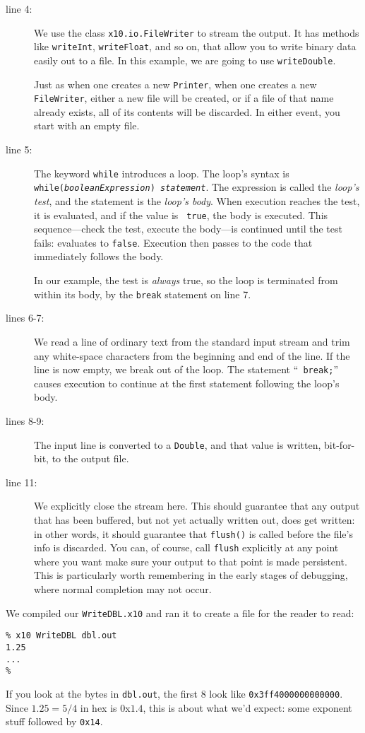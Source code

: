 \begin{description}
\item[line 4:] We use the class {\tt x10.io.FileWriter} to stream the output. 
It has methods like {\tt writeInt}, {\tt writeFloat}, and so on, that allow you
to write binary data easily out to a file.  In this example, we are going to use
{\tt writeDouble}.

Just as when one creates a new {\tt Printer}, when one creates a new {\tt
FileWriter}, either a new file will be created, or if a file of that
name already exists, all of its contents will be discarded.  In either event,
you start with an empty file.
\item[line 5:] The keyword {\tt while} introduces a loop.  The loop's syntax is
{\tt while({\em boolean\-Expres\-sion}) {\em statement}}.  The expression is
called the {\em loop's test}, and the statement is the {\em loop's body}. 
When execution reaches the test, it is evaluated, and if the value is {\tt
true}, the body is executed. This sequence---check the test, execute the
body---is continued until the test fails: \ie{} evaluates to {\tt false}.
Execution then passes to the code that immediately follows the body.

In our example, the test is {\em always} true, so the loop is 
terminated from within its body, by the {\tt break} statement on line 7.  
\item[lines 6-7:] We read a line of ordinary text from the standard input
stream and trim any white-space characters from the beginning and end of the
line.  If the line is now empty, we break out of the loop.  The statement ``{\tt
break;}'' causes execution to continue at the first statement following the
loop's body.
\item[lines 8-9:] The input line is converted to a {\tt Double}, and that
value is written, bit-for-bit, to the output file.
\item[line 11:] We explicitly close the stream here.  This should guarantee that
any output that has been buffered, but not yet actually written out, does
get written: in other words, it should guarantee that {\tt flush()} is called
before the file's info is discarded.  You can, of course, call {\tt flush}
explicitly at any point where you want make sure your output to that point is
made persistent. This is particularly worth remembering in the early stages of
debugging, where normal completion may not occur.
\end{description}
We compiled our {\tt WriteDBL.x10} and ran it to create a file for the reader to
read:
\begin{verbatim}
% x10 WriteDBL dbl.out
1.25
...
%
\end{verbatim}
If you look at the bytes in {\tt dbl.out}, the first 8 look like {\tt 0x3ff4000000000000}.
Since $1.25 = 5/4$ in hex is 0x$1.4$, this is about what we'd expect: some 
exponent stuff followed by {\tt 0x14}.

